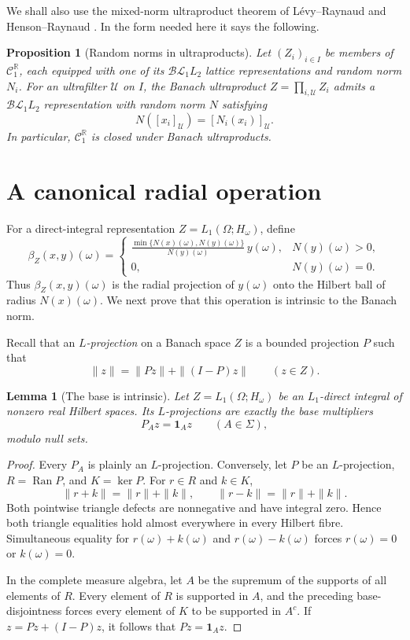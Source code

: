\documentclass[11pt]{article}
\newcommand{\BL}{\mathcal{BL}}
\newcommand{\C}{\mathcal C}
\newcommand{\U}{\mathcal U}
\newcommand{\R}{\mathbb R}
\newcommand{\1}{\mathbf 1}
\newcommand{\Ran}{\operatorname{Ran}}
\newtheorem{proposition}[theorem]{Proposition}
\newtheorem{lemma}[theorem]{Lemma}
\theoremstyle{definition}
\theoremstyle{remark}
\begin{document}
We shall also use the mixed-norm ultraproduct theorem of L\'evy--Raynaud and
Henson--Raynaud \cite{LevyRaynaud1984,HensonRaynaud2007,HensonRaynaud2011}.
In the form needed here it says the following.

\begin{proposition}[Random norms in ultraproducts]
\label{prop:random-ultra}
Let $(Z_i)_{i\in I}$ be members of $\C_1^{\R}$, each equipped with one of its
$\BL_1L_2$ lattice representations and random norm $N_i$.  For an
ultrafilter $\U$ on $I$, the Banach ultraproduct
$Z=\prod_{i,\U}Z_i$ admits a $\BL_1L_2$ representation with random norm $N$
satisfying
\[
             N([x_i]_{\U})=[N_i(x_i)]_{\U}.
\]
In particular, $\C_1^{\R}$ is closed under Banach ultraproducts.
\end{proposition}

\section{A canonical radial operation}

For a direct-integral representation $Z=L_1(\Omega;H_\omega)$, define
\begin{equation}
\label{eq:beta-def}
 \beta_Z(x,y)(\omega)=
 \begin{cases}
 \displaystyle
 \frac{\min\{N(x)(\omega),N(y)(\omega)\}}{N(y)(\omega)}\,y(\omega),
      &N(y)(\omega)>0,\\[1.2ex]
 0,   &N(y)(\omega)=0.
 \end{cases}
\end{equation}
Thus $\beta_Z(x,y)(\omega)$ is the radial projection of $y(\omega)$ onto the
Hilbert ball of radius $N(x)(\omega)$.  We next prove that this operation is
intrinsic to the Banach norm.

Recall that an \emph{$L$-projection} on a Banach space $Z$ is a bounded
projection $P$ such that
\[
          \|z\|=\|Pz\|+\|(I-P)z\|\qquad(z\in Z).
\]

\begin{lemma}[The base is intrinsic]
\label{lem:L-projections}
Let $Z=L_1(\Omega;H_\omega)$ be an $L_1$-direct integral of nonzero real
Hilbert spaces.  Its $L$-projections are exactly the base multipliers
\[
                     P_Az=\1_Az\qquad(A\in\Sigma),
\]
modulo null sets.
\end{lemma}

\begin{proof}
Every $P_A$ is plainly an $L$-projection.  Conversely, let $P$ be an
$L$-projection, $R=\Ran P$, and $K=\ker P$.  For $r\in R$ and $k\in K$,
\[
 \|r+k\|=\|r\|+\|k\|,
 \qquad
 \|r-k\|=\|r\|+\|k\|.
\]
Both pointwise triangle defects are nonnegative and have integral zero.
Hence both triangle equalities hold almost everywhere in every Hilbert
fibre.  Simultaneous equality for $r(\omega)+k(\omega)$ and
$r(\omega)-k(\omega)$ forces $r(\omega)=0$ or $k(\omega)=0$.

In the complete measure algebra, let $A$ be the supremum of the supports of
all elements of $R$.  Every element of $R$ is supported in $A$, and the
preceding base-disjointness forces every element of $K$ to be supported in
$A^c$.  If $z=Pz+(I-P)z$, it follows that $Pz=\1_Az$.
\end{proof}
\end{document}
